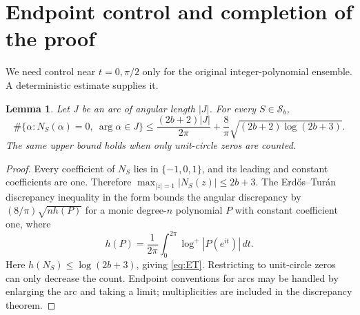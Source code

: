 \documentclass[11pt]{article}
\newtheorem{lemma}[theorem]{Lemma}
\begin{document}
\section{Endpoint control and completion of the proof}
We need control near $t=0,\pi/2$ only for the original integer-polynomial
ensemble. A deterministic estimate supplies it.

\begin{lemma}\label{lem:endpoints}
Let $J$ be an arc of angular length $|J|$. For every $S\in\mathcal S_b$,
\begin{equation}\label{eq:ET}
 \#\{\alpha:N_S(\alpha)=0,\ \arg\alpha\in J\}
 \le\frac{(2b+2)|J|}{2\pi}
       +\frac8\pi\sqrt{(2b+2)\log(2b+3)}.
\end{equation}
The same upper bound holds when only unit-circle zeros are counted.
\end{lemma}
\begin{proof}
Every coefficient of $N_S$ lies in $\{-1,0,1\}$, and its leading and
constant coefficients are one. Therefore
$\max_{|z|=1}|N_S(z)|\le2b+3$.
The Erd\H{o}s--Tur\'an discrepancy inequality in the form
\cite[Theorem 2]{Sound} bounds the angular discrepancy by
$(8/\pi)\sqrt{n h(P)}$ for a monic degree-$n$ polynomial $P$ with
constant coefficient one, where
\[
 h(P)=\frac1{2\pi}\int_0^{2\pi}\log^+|P(e^{it})|\,dt.
\]
Here $h(N_S)\le\log(2b+3)$, giving \eqref{eq:ET}.
Restricting to unit-circle zeros can only decrease the count.
Endpoint conventions for arcs may be handled by enlarging the arc and
taking a limit; multiplicities are included in the discrepancy theorem.
\end{proof}
\end{document}
